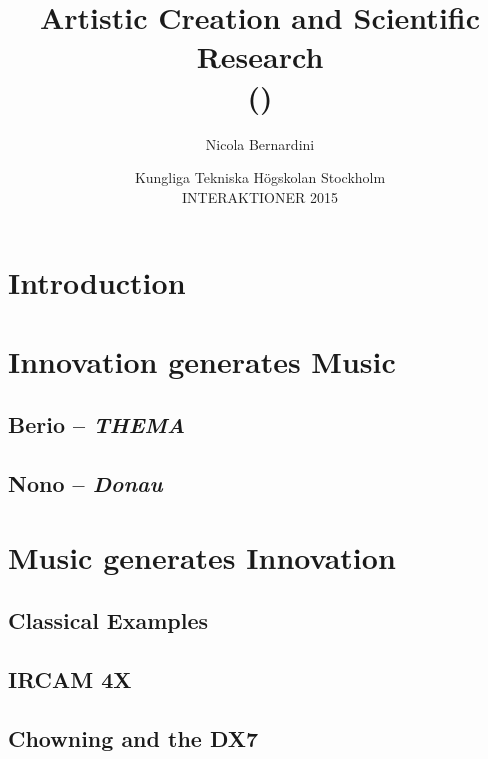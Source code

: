 \documentclass[\printmode,compress]{beamer}
\title[Artistic Creation and Scientific Research]
{%
    Artistic Creation and Scientific Research\\
	  {\tiny (\rcstag)}
}
\author{%
	Nicola Bernardini\\
    \href{mailto:\cpholderemail}{\cpholderemail}
}
\institute[SMERM]%
{%
	\href{http://www.conservatoriosantacecilia.it}
		 {Conservatorio di Musica ``S.Cecilia'' -- Roma}
}
\date[KTH Stockholm, 14/12/2015]{Kungliga Tekniska H\"ogskolan Stockholm\\INTERAKTIONER 2015}
\begin{document}
  
\begin{frame}
	\titlepage
\end{frame}



\section{Introduction}



\section[Innovation $\Rightarrow$ Music]{Innovation generates Music}

\subsection{Berio -- {\it THEMA}}



\subsection{Nono -- {\it Donau}}



\section[Music $\Rightarrow$ Innovation]{Music generates Innovation}

\subsection[Classics]{Classical Examples}



\subsection[4X]{IRCAM 4X}



\subsection[DX7]{Chowning and the DX7}


\end{document}
